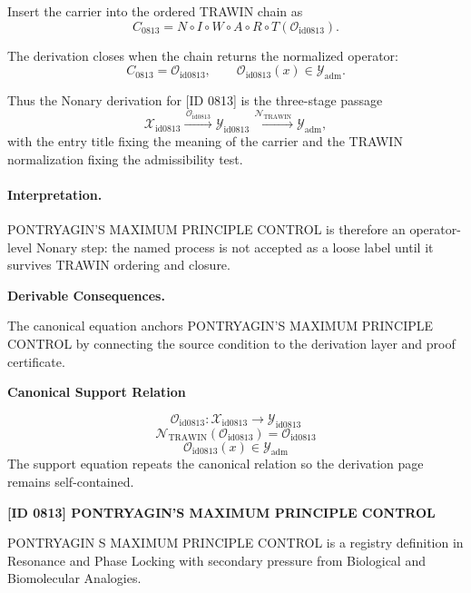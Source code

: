 Insert the carrier into the ordered TRAWIN chain as\[
C_{0813}=N\circ I\circ W\circ A\circ R\circ T(\mathcal{O}_{\mathrm{id0813}}).
\]

The derivation closes when the chain returns the normalized operator:\[
C_{0813}=\mathcal{O}_{\mathrm{id0813}},\qquad \mathcal{O}_{\mathrm{id0813}}(x)\in\mathcal{Y}_{\mathrm{adm}}.
\]

Thus the Nonary derivation for [ID 0813] is the three-stage passage
\[
\mathcal{X}_{\mathrm{id0813}}\xrightarrow{\,\mathcal{O}_{\mathrm{id0813}}\,} \mathcal{Y}_{\mathrm{id0813}}\xrightarrow{\,\mathcal{N}_{\mathrm{TRAWIN}}\,} \mathcal{Y}_{\mathrm{adm}},
\]
with the entry title fixing the meaning of the carrier and the TRAWIN normalization fixing the admissibility test.

\paragraph{Interpretation.} PONTRYAGIN’S MAXIMUM PRINCIPLE CONTROL is therefore an operator-level Nonary step: the named process is not accepted as a loose label until it survives TRAWIN ordering and closure.

\par\vspace{0.35em}
\noindent\textbf{Derivable Consequences.}\quad
\begingroup
\footnotesize
\raggedright
The canonical equation anchors PONTRYAGIN'S MAXIMUM PRINCIPLE CONTROL by connecting the source condition to the derivation layer and proof certificate.
\par\endgroup

\noindent\textbf{Canonical Support Relation}\par
\[
\mathcal{O}_{\mathrm{id0813}}:\mathcal{X}_{\mathrm{id0813}}\longrightarrow\mathcal{Y}_{\mathrm{id0813}}
\]
\[
\mathcal{N}_{\mathrm{TRAWIN}}(\mathcal{O}_{\mathrm{id0813}})=\mathcal{O}_{\mathrm{id0813}}
\]
\[
\mathcal{O}_{\mathrm{id0813}}(x)\in\mathcal{Y}_{\mathrm{adm}}
\]
\noindent The support equation repeats the canonical relation so the derivation page remains self-contained.\par

\clearpage
\noindent\textbf{[ID 0813] PONTRYAGIN'S MAXIMUM PRINCIPLE CONTROL}\par
\vspace{0.35em}
\begingroup\small
{}
PONTRYAGIN S MAXIMUM PRINCIPLE CONTROL is a registry definition in Resonance and Phase Locking with secondary pressure from Biological and Biomolecular Analogies.

